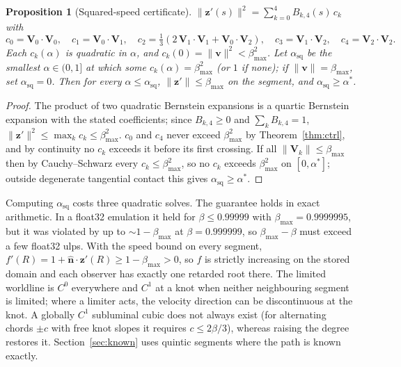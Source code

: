 \documentclass[11pt, a4paper]{article}
\newtheorem{proposition}{Proposition}
\begin{document}
\begin{proposition}[Squared-speed certificate]\label{prop:sq}
$\|\mathbf{z}'(s)\|^2 = \sum_{k=0}^{4} B_{k,4}(s)\,c_k$ with
\[
c_0 = \mathbf{V}_0\!\cdot\!\mathbf{V}_0,\quad c_1 = \mathbf{V}_0\!\cdot\!\mathbf{V}_1,\quad c_2 = \tfrac13\left(2\,\mathbf{V}_1\!\cdot\!\mathbf{V}_1 + \mathbf{V}_0\!\cdot\!\mathbf{V}_2\right),\quad c_3 = \mathbf{V}_1\!\cdot\!\mathbf{V}_2,\quad c_4 = \mathbf{V}_2\!\cdot\!\mathbf{V}_2 .
\]
Each $c_k(\alpha)$ is quadratic in $\alpha$, and $c_k(0) = \|\mathbf{v}\|^2 < \beta_{\max}^2$. Let $\alpha_{\text{sq}}$ be the smallest $\alpha \in (0, 1]$ at which some $c_k(\alpha) = \beta_{\max}^2$ (or $1$ if none); if $\|\mathbf{v}\| = \beta_{\max}$, set $\alpha_{\text{sq}} = 0$. Then for every $\alpha \le \alpha_{\text{sq}}$, $\|\mathbf{z}'\| \le \beta_{\max}$ on the segment, and $\alpha_{\text{sq}} \ge \alpha^*$.
\end{proposition}
\begin{proof}
The product of two quadratic Bernstein expansions is a quartic Bernstein expansion with the stated coefficients; since $B_{k,4} \ge 0$ and $\sum_k B_{k,4} = 1$, $\|\mathbf{z}'\|^2 \le \max_k c_k \le \beta_{\max}^2$. $c_0$ and $c_4$ never exceed $\beta_{\max}^2$ by Theorem~\ref{thm:ctrl}, and by continuity no $c_k$ exceeds it before its first crossing. If all $\|\mathbf{V}_k\| \le \beta_{\max}$ then by Cauchy--Schwarz every $c_k \le \beta_{\max}^2$, so no $c_k$ exceeds $\beta_{\max}^2$ on $[0, \alpha^*]$; outside degenerate tangential contact this gives $\alpha_{\text{sq}} \ge \alpha^*$.
\end{proof}

Computing $\alpha_{\text{sq}}$ costs three quadratic solves. The guarantee holds in exact arithmetic. In a float32 emulation it held for $\beta \le 0.99999$ with $\beta_{\max} = 0.9999995$, but it was violated by up to $\sim\!1 - \beta_{\max}$ at $\beta = 0.999999$, so $\beta_{\max} - \beta$ must exceed a few float32 ulps. With the speed bound on every segment, $f'(R) = 1 + \hat{\mathbf{n}}\cdot\mathbf{z}'(R) \ge 1 - \beta_{\max} > 0$, so $f$ is strictly increasing on the stored domain and each observer has exactly one retarded root there. The limited worldline is $C^0$ everywhere and $C^1$ at a knot when neither neighbouring segment is limited; where a limiter acts, the velocity direction can be discontinuous at the knot. A globally $C^1$ subluminal cubic does not always exist (for alternating chords $\pm c$ with free knot slopes it requires $c \le 2\beta/3$), whereas raising the degree restores it. Section~\ref{sec:known} uses quintic segments where the path is known exactly.
\end{document}
